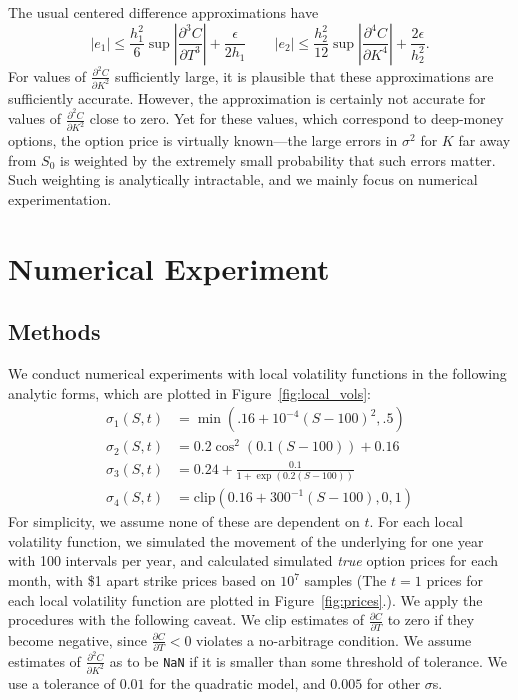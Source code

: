 \documentclass[11pt]{article}
\numberwithin{equation}{section}
\newcommand{\diff}[2]{\frac{\partial #1}{\partial #2}}
\newcommand{\abs}[1]{\left|#1\right|}
\begin{document}
The usual centered difference approximations have
\[
|e_1|\le \frac{h_1^2}{6}\sup \abs{\diff{^3C}{T^3}} + \frac{\epsilon}{2h_1}
\qquad |e_2| \le \frac{h_2^2}{12}\sup \abs{\diff{^4C}{K^4}} +
\frac{2\epsilon}{h_2^2}.
\]
For values of $\diff{^2C}{K^2}$ sufficiently large, it is plausible that these
approximations are sufficiently accurate. However, the approximation is
certainly not accurate for values of $\diff{^2C}{K^2}$ close to zero. Yet for
these values, which correspond to deep-money options, the option price is
virtually known---the large errors in $\sigma^2$ for $K$ far away from $S_0$ is
weighted by the extremely small probability that such errors matter. Such
weighting is analytically intractable, and we mainly focus on numerical
experimentation. 
 
 
\section{Numerical Experiment}
\label{sec:numericalexp}

\subsection{Methods}
We conduct numerical experiments with local volatility functions in the
following analytic forms, which are plotted in Figure~\ref{fig:local_vols}:
\begin{align*}
\sigma_1(S,t) &= \min(.16 + 10^{-4}(S-100)^2, .5) \tag{Quadratic}\\
\sigma_2(S,t) &= 0.2\cos^2(0.1(S-100)) + 0.16 \tag{Sinusoidal}\\
\sigma_3(S,t) &= 0.24 + \frac{0.1}{1+\exp(0.2(S-100))} \tag{Logistic} \\
\sigma_4(S,t) &= \text{clip}(0.16 + 300^{-1}(S - 100),0,1) \tag{Linear}
\end{align*}
For simplicity, we assume none of these are dependent on $t$. For each local
volatility function, we simulated the movement of the underlying for one year
with 100 intervals per year, and calculated simulated \emph{true} option prices
for each month, with \$1 apart strike prices based on $10^7$ samples (The $t=1$
prices for each local volatility function are plotted in
Figure~\ref{fig:prices}.). We apply the procedures with the following caveat. We
clip estimates of $\diff{C}{T}$ to zero if they become negative, since
$\diff{C}{T} < 0$ violates a no-arbitrage condition. We assume estimates of
$\diff{^2C}{K^2}$ as to be \texttt{NaN} if it is smaller than some threshold of
tolerance. We use a tolerance of $0.01$ for the quadratic model, and $0.005$ for
other $\sigma$s. 
 
\end{document}
